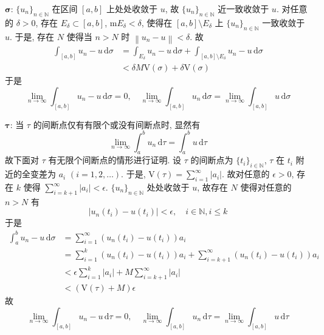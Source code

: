 \documentclass[../main.tex]{subfiles}
\begin{document}
\noindent $\mathbf{\sigma}$:
$\{ u_{n} \}_{n \in \mathbb{N}}$ 在区间 $[a, b]$ 上处处收敛于 $u$,
故 $\{ u_{n} \}_{n \in \mathbb{N}}$ 近一致收敛于 $u$.
对任意的 $\delta > 0$, 存在 $E_\delta \subset [a, b]$, $\mathrm{m} E_\delta < \delta$,
使得在 $[a, b] \setminus E_\delta$ 上 $\{ u_{n} \}_{n \in \mathbb{N}}$ 一致收敛于 $u$.
于是, 存在 $N$ 使得当 $n > N$ 时 $\left\| u_n - u \right\| < \delta$.
故
\begin{align*}
    \int_{[a, b]} u_n - u \, \mathrm{d} \sigma
    &= \int_{E_\delta} u_n - u \, \mathrm{d} \sigma
        + \int_{[a, b] \setminus E_\delta} u_n - u \, \mathrm{d} \sigma \\
    &< \delta M \mathrm{V} \left( \sigma \right) + \delta \mathrm{V} \left( \sigma \right)
\end{align*}
于是
\[
    \lim_{n \to \infty} \int_{[a, b]} u_n - u \, \mathrm{d} \sigma = 0
    , \quad
    \lim_{n \to \infty} \int_{[a, b]} u_n \, \mathrm{d} \sigma 
    = \lim_{n \to \infty} \int_{[a, b]} u \, \mathrm{d} \sigma
\]

\noindent $\mathbf{\tau}$:
当 $\tau$ 的间断点仅有有限个或没有间断点时, 显然有
\[
    \lim_{n \to \infty} \int_{a}^{b} u_n \, \mathrm{d} \tau = \int_{a}^{b} u \, \mathrm{d} \tau
\]
故下面对 $\tau$ 有无限个间断点的情形进行证明.
设 $\tau$ 的间断点为 $\{ t_{i} \}_{i \in \mathbb{N}}$,
$\tau$ 在 $t_i$ 附近的全变差为 $a_i$ $\left( i = 1, 2, \dots \right)$.
于是, $\mathrm{V} \left( \tau \right) = \sum_{i = 1}^{\infty} \left| a_i \right|$.
故对任意的 $\epsilon > 0$, 存在 $k$ 使得 $\sum_{i = k + 1}^{\infty} \left| a_i \right| < \epsilon$.
$\{ u_{n} \}_{n \in \mathbb{N}}$ 处处收敛于 $u$, 故存在 $N$ 使得对任意的 $n > N$ 有
\[
    \left| u_n \left( t_i \right) - u \left( t_i \right) \right| < \epsilon
    , \quad i \in \mathbb{N}, i \leqslant k
\]
于是
\begin{align*}
    \int_{a}^{b} u_n - u \, \mathrm{d} \sigma
    &= \sum_{i = 1}^{\infty}\left( u_n \left( t_i \right) - u \left( t_i \right) \right) a_i \\
    &= \sum_{i = 1}^{k}\left( u_n \left( t_i \right) - u \left( t_i \right) \right) a_i
        + \sum_{i = k + 1}^{\infty}\left( u_n \left( t_i \right) - u \left( t_i \right) \right) a_i \\
    &< \epsilon \sum_{i = 1}^{k} \left| a_i \right| + M \sum_{i = k + 1}^{\infty} \left| a_i \right| \\
    &< \left( \mathrm{V} \left( \tau \right) + M \right) \epsilon
\end{align*}
故
\[
    \lim_{n \to \infty} \int_{[a, b]} u_n - u \, \mathrm{d} \tau = 0
    , \quad
    \lim_{n \to \infty} \int_{[a, b]} u_n \, \mathrm{d} \tau 
    = \lim_{n \to \infty} \int_{[a, b]} u \, \mathrm{d} \tau
\]
\end{document}
